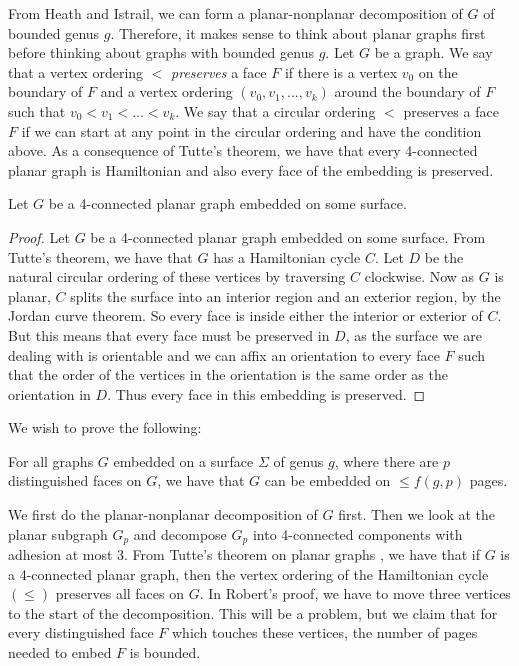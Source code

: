 From Heath and Istrail, we can form a planar-nonplanar decomposition of $G$ of bounded genus $g$. Therefore, it makes sense to think about planar graphs first before thinking about graphs with bounded genus $g$.
Let $G$ be a graph. We say that a vertex ordering $<$ \textit{preserves} a face $F$ if there is a vertex $v_0$ on the boundary of $F$ and a vertex ordering $(v_0, v_1, ..., v_k)$ around the boundary of $F$ such that $v_0 < v_1 < ... < v_k$. We say that a circular ordering $<$ preserves a face $F$ if we can start at any point in the circular ordering and have the condition above. 
As a consequence of Tutte's theorem, we have that every 4-connected planar graph is Hamiltonian and also every face of the embedding is preserved.
\begin{theorem}
	Let $G$ be a 4-connected planar graph embedded on some surface. 
\end{theorem}

\begin{proof}
	Let $G$ be a 4-connected planar graph embedded on some surface. From Tutte's theorem, we have that $G$ has a Hamiltonian cycle $C$. Let $D$ be the natural circular ordering of these vertices by traversing $C$ clockwise. Now as $G$ is planar, $C$ splits the surface into an interior region and an exterior region, by the Jordan curve theorem. So every face is inside either the interior or exterior of $C$. But this means that every face must be preserved in $D$, as the surface we are dealing with is orientable and we can affix an orientation to every face $F$ such that the order of the vertices in the orientation is the same order as the orientation in $D$. Thus every face in this embedding is preserved. 
	
\end{proof}

We wish to prove the following:

\begin{conjecture}\label{conj:4-planar graphs}
	For all graphs $G$ embedded on a surface $\Sigma$ of genus $g$, where there are $p$ distinguished faces on $G$, we have that $G$ can be embedded on $\leq f(g, p)$ pages.
\end{conjecture}
We first do the planar-nonplanar decomposition of $G$ first. 
Then we look at the planar subgraph $G_p$ and decompose $G_p$ into 4-connected components with adhesion at most 3.
From Tutte's theorem on planar graphs \cite{tutteTheoremPlanarGraphs1956}, we have that if $G$ is a 4-connected planar graph, then the vertex ordering of the Hamiltonian cycle $(\leq)$ preserves all faces on $G$.
In Robert's proof, we have to move three vertices to the start of the decomposition. This will be a problem, but we claim that for every distinguished face $F$ which touches these vertices, the number of pages needed to embed $F$ is bounded. 


